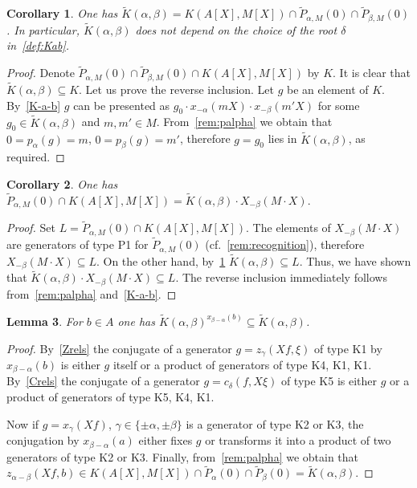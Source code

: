 \documentclass[10pt,a4paper,twoside]{article}
\newtheorem{lemma}{Lemma}
\newtheorem{corollary}[lemma]{Corollary}
\theoremstyle{remark}
\theoremstyle{definition}
\numberwithin{lemma}{section}
\numberwithin{prop}{section}
\numberwithin{corollary}{section}
\numberwithin{externaltheorem}{section}
\numberwithin{equation}{section}
\begin{document}
\begin{corollary} \label{K-a-b-cor}
One has $\widetilde{K}(\alpha, \beta) = K(A[X], M[X]) \cap \widetilde{P}_{\alpha, M}(0) \cap \widetilde{P}_{\beta, M}(0)$. In particular, $\widetilde{K}(\alpha, \beta)$ does not depend on the choice of the root $\delta$ in~\cref{def:Kab}.
\end{corollary}
\begin{proof} Denote $\widetilde{P}_{\alpha, M}(0) \cap \widetilde{P}_{\beta, M}(0) \cap K(A[X], M[X])$ by $K$. It is clear that $\widetilde{K}(\alpha, \beta) \subseteq K$. 
Let us prove the reverse inclusion. Let $g$ be an element of $K$.
By~\cref{K-a-b} $g$ can be presented as $g_0 \cdot x_{-\alpha}(mX) \cdot x_{-\beta}(m'X)$ for some $g_0 \in \widetilde{K}(\alpha, \beta)$ and $m, m' \in M$. From~\cref{rem:palpha} we obtain that $0 = p_\alpha(g) = m$, $0 = p_\beta(g) = m'$, therefore $g = g_0$ lies in $\widetilde{K}(\alpha, \beta)$, as required.\end{proof}

\begin{corollary} \label{K-a-b-cor2}
 One has $\widetilde{P}_{\alpha, M}(0) \cap K(A[X], M[X]) = \widetilde{K}(\alpha, \beta) \cdot X_{-\beta}(M \cdot X).$ 
\end{corollary}
\begin{proof} Set $L = \widetilde{P}_{\alpha, M}(0) \cap K(A[X], M[X])$.
The elements of $X_{-\beta}(M\cdot X)$ are generators of type P1 for $\widetilde{P}_{\alpha, M}(0)$ (cf.~\cref{rem:recognition}),
 therefore $X_{-\beta}(M \cdot X) \subseteq L$. On the other hand, by~\cref{K-a-b-cor} $\widetilde{K}(\alpha, \beta) \subseteq L$. Thus, we have shown that $\widetilde{K}(\alpha, \beta) \cdot X_{-\beta}(M \cdot X) \subseteq L$. The reverse inclusion immediately follows from~\cref{rem:palpha} and~\cref{K-a-b}.
 \end{proof}
 
\begin{lemma} \label{conj-K-a-b} For $b \in A$ one has $\widetilde{K}(\alpha, \beta)^{x_{\beta - \alpha}(b)} \subseteq \widetilde{K}(\alpha, \beta)$. \end{lemma}
\begin{proof} By~\cref{Zrels} the conjugate of a generator $g = z_\gamma(Xf, \xi)$ of type K1 by $x_{\beta-\alpha}(b)$ is either $g$ itself or a product of generators of type K4, K1, K1. By~\cref{Crels} the conjugate of a generator $g = c_\delta(f, X\xi)$ of type K5 is either $g$ or a product of generators of type K5, K4, K1.

Now if $g = x_\gamma(Xf)$, $\gamma \in \{\pm \alpha, \pm \beta\}$ is a generator of type K2 or K3, the conjugation by $x_{\beta-\alpha}(a)$ either fixes $g$ or transforms it into a product of two generators of type K2 or K3.  Finally, from~\cref{rem:palpha} we obtain that $z_{\alpha-\beta}(Xf, b) \in K(A[X], M[X]) \cap \widetilde{P}_\alpha(0) \cap \widetilde{P}_{\beta}(0) = \widetilde{K}(\alpha, \beta)$. \end{proof}  
\end{document}

